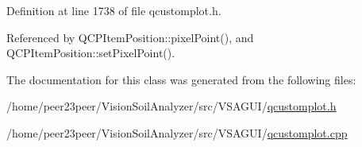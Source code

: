 Definition at line 1738 of file qcustomplot.\+h.



Referenced by Q\+C\+P\+Item\+Position\+::pixel\+Point(), and Q\+C\+P\+Item\+Position\+::set\+Pixel\+Point().



The documentation for this class was generated from the following files\+:\begin{DoxyCompactItemize}
\item 
/home/peer23peer/\+Vision\+Soil\+Analyzer/src/\+V\+S\+A\+G\+U\+I/\hyperlink{qcustomplot_8h}{qcustomplot.\+h}\item 
/home/peer23peer/\+Vision\+Soil\+Analyzer/src/\+V\+S\+A\+G\+U\+I/\hyperlink{qcustomplot_8cpp}{qcustomplot.\+cpp}\end{DoxyCompactItemize}
